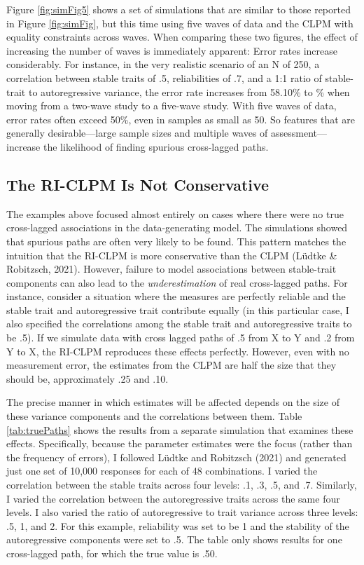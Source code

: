 \documentclass[
  english,
  man,floatsintext]{apa6}
\begin{document}
Figure \ref{fig:simFig5} shows a set of simulations that are similar to those reported in Figure \ref{fig:simFig}, but this time using five waves of data and the CLPM with equality constraints across waves. When comparing these two figures, the effect of increasing the number of waves is immediately apparent: Error rates increase considerably. For instance, in the very realistic scenario of an N of 250, a correlation between stable traits of .5, reliabilities of .7, and a 1:1 ratio of stable-trait to autoregressive variance, the error rate increases from 58.10\% to \% when moving from a two-wave study to a five-wave study. With five waves of data, error rates often exceed 50\%, even in samples as small as 50. So features that are generally desirable---large sample sizes and multiple waves of assessment---increase the likelihood of finding spurious cross-lagged paths.

\hypertarget{the-ri-clpm-is-not-conservative}{%
\subsection{The RI-CLPM Is Not Conservative}\label{the-ri-clpm-is-not-conservative}}

The examples above focused almost entirely on cases where there were no true cross-lagged associations in the data-generating model. The simulations showed that spurious paths are often very likely to be found. This pattern matches the intuition that the RI-CLPM is more conservative than the CLPM (Lüdtke \& Robitzsch, 2021). However, failure to model associations between stable-trait components can also lead to the \emph{underestimation} of real cross-lagged paths. For instance, consider a situation where the measures are perfectly reliable and the stable trait and autoregressive trait contribute equally (in this particular case, I also specified the correlations among the stable trait and autoregressive traits to be .5). If we simulate data with cross lagged paths of .5 from X to Y and .2 from Y to X, the RI-CLPM reproduces these effects perfectly. However, even with no measurement error, the estimates from the CLPM are half the size that they should be, approximately .25 and .10.

The precise manner in which estimates will be affected depends on the size of these variance components and the correlations between them. Table \ref{tab:truePaths} shows the results from a separate simulation that examines these effects. Specifically, because the parameter estimates were the focus (rather than the frequency of errors), I followed Lüdtke and Robitzsch (2021) and generated just one set of 10,000 responses for each of 48 combinations. I varied the correlation between the stable traits across four levels: .1, .3, .5, and .7. Similarly, I varied the correlation between the autoregressive traits across the same four levels. I also varied the ratio of autoregressive to trait variance across three levels: .5, 1, and 2. For this example, reliability was set to be 1 and the stability of the autoregressive components were set to .5. The table only shows results for one cross-lagged path, for which the true value is .50.
\end{document}
